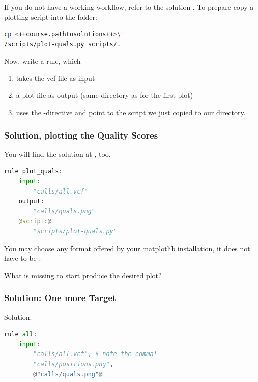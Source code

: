 \begin{frame}[fragile]
	\frametitle{}
	If you do not have a working workflow, refer to the solution .\newline
	To prepare copy a plotting script into the  folder:
	\begin{lstlisting}[language=Bash, style=Shell, basicstyle=\footnotesize]
cp <++course.pathtosolutions++>\
/scripts/plot-quals.py scripts/.
    \end{lstlisting}
    Now, write a rule, which
    \begin{enumerate}
    	\item takes the vcf file as input
    	\item a plot file as output (same directory as for the first plot)
    	\item uses the \altverb{script}-directive and point to the script we just copied to our  directory.
    \end{enumerate}
\end{frame}

\begin{frame}[fragile]
  \frametitle{Solution, plotting the Quality Scores}
  You will find the solution at , too.
  \begin{lstlisting}[language=Python,style=Python]
rule plot_quals:
    input:
        "calls/all.vcf"
    output:
        "calls/quals.png"
    @script:@
        "scripts/plot-quals.py"
  \end{lstlisting}
  \begin{hint}
  	You may choose any format offered by your matplotlib installation, it does not have to be .
  \end{hint}
  \pause
  \begin{question}
  	What is missing to start produce the desired plot?
  \end{question}
\end{frame}

\begin{frame}[fragile]
	\frametitle{Solution: One more Target}
	
	Solution:
	\begin{lstlisting}[language=Python,style=Python]
rule all:
    input:
        "calls/all.vcf", # note the comma!
        "calls/positions.png",
        @"calls/quals.png"@
	\end{lstlisting}
\end{frame}

